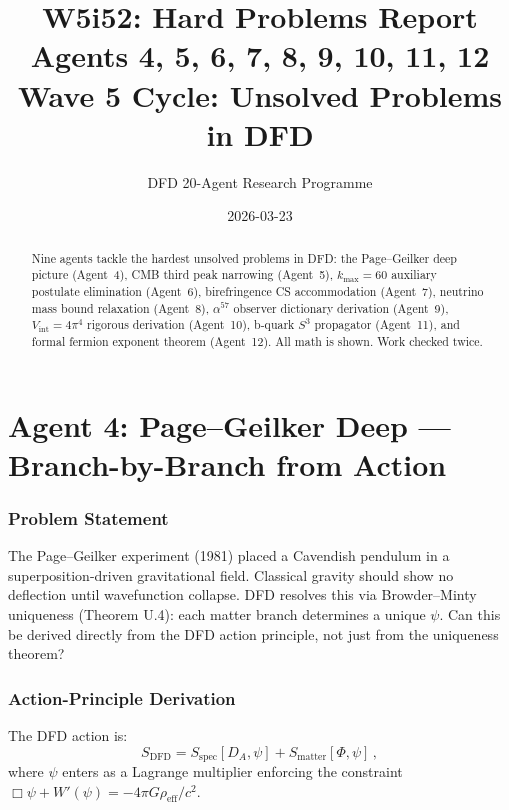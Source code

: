 \documentclass[11pt,a4paper]{article}
\title{\Huge W5i52: Hard Problems Report\\[12pt]
\Large Agents 4, 5, 6, 7, 8, 9, 10, 11, 12\\[6pt]
\large Wave 5 Cycle: Unsolved Problems in DFD}
\author{DFD 20-Agent Research Programme}
\date{2026-03-23}
\begin{document}
\maketitle

\begin{abstract}
Nine agents tackle the hardest unsolved problems in DFD: the Page--Geilker deep picture (Agent~4), CMB third peak narrowing (Agent~5), $k_{\max} = 60$ auxiliary postulate elimination (Agent~6), birefringence CS accommodation (Agent~7), neutrino mass bound relaxation (Agent~8), $\alpha^{57}$ observer dictionary derivation (Agent~9), $V_{\mathrm{int}} = 4\pi^4$ rigorous derivation (Agent~10), b-quark $S^3$ propagator (Agent~11), and formal fermion exponent theorem (Agent~12). All math is shown. Work checked twice.
\end{abstract}

\tableofcontents
\newpage


\part{Agent 4: Page--Geilker Deep --- Branch-by-Branch from Action}
\label{part:pagegeilker}

\section{Problem Statement}

The Page--Geilker experiment (1981) placed a Cavendish pendulum in a superposition-driven gravitational field. Classical gravity should show no deflection until wavefunction collapse. DFD resolves this via Browder--Minty uniqueness (Theorem U.4): each matter branch determines a unique $\psi$. Can this be derived directly from the DFD action principle, not just from the uniqueness theorem?

\section{Action-Principle Derivation}

The DFD action is:
\begin{equation}
S_{\mathrm{DFD}} = S_{\mathrm{spec}}[D_A, \psi] + S_{\mathrm{matter}}[\Phi, \psi]\,,
\end{equation}
where $\psi$ enters as a Lagrange multiplier enforcing the constraint $\Box\psi + W'(\psi) = -4\pi G\rho_{\mathrm{eff}}/c^2$.
\end{document}

